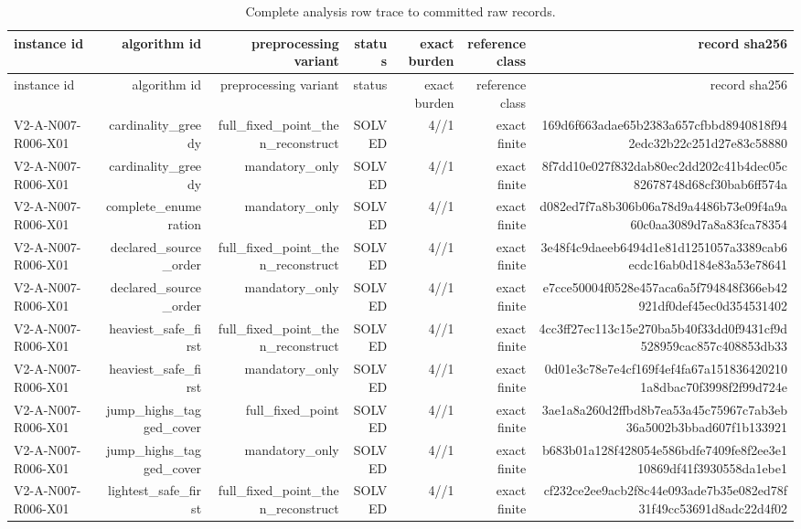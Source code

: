 {\footnotesize
\begin{longtable}{lrrrrrr}
\caption{Complete analysis row trace to committed raw records.}\label{tab:aor-analysis-trace}\\
\toprule
instance id & algorithm id & preprocessing variant & status & exact burden & reference class & record sha256 \\
\midrule
\endfirsthead
\toprule
instance id & algorithm id & preprocessing variant & status & exact burden & reference class & record sha256 \\
\midrule
\endhead
V2-A-N007-R006-X01 & cardinality\_greedy & full\_fixed\_point\_then\_reconstruct & SOLVED & 4//1 & exact finite & 169d6f663adae65b2383a657cfbbd8940818f942edc32b22c251d27e83c58880 \\
V2-A-N007-R006-X01 & cardinality\_greedy & mandatory\_only & SOLVED & 4//1 & exact finite & 8f7dd10e027f832dab80ec2dd202c41b4dec05c82678748d68cf30bab6ff574a \\
V2-A-N007-R006-X01 & complete\_enumeration & mandatory\_only & SOLVED & 4//1 & exact finite & d082ed7f7a8b306b06a78d9a4486b73e09f4a9a60c0aa3089d7a8a83fca78354 \\
V2-A-N007-R006-X01 & declared\_source\_order & full\_fixed\_point\_then\_reconstruct & SOLVED & 4//1 & exact finite & 3e48f4c9daeeb6494d1e81d1251057a3389cab6ecdc16ab0d184e83a53e78641 \\
V2-A-N007-R006-X01 & declared\_source\_order & mandatory\_only & SOLVED & 4//1 & exact finite & e7cce50004f0528e457aca6a5f794848f366eb42921df0def45ec0d354531402 \\
V2-A-N007-R006-X01 & heaviest\_safe\_first & full\_fixed\_point\_then\_reconstruct & SOLVED & 4//1 & exact finite & 4cc3ff27ec113c15e270ba5b40f33dd0f9431cf9d528959cac857c408853db33 \\
V2-A-N007-R006-X01 & heaviest\_safe\_first & mandatory\_only & SOLVED & 4//1 & exact finite & 0d01e3c78e7e4cf169f4ef4fa67a1518364202101a8dbac70f3998f2f99d724e \\
V2-A-N007-R006-X01 & jump\_highs\_tagged\_cover & full\_fixed\_point & SOLVED & 4//1 & exact finite & 3ae1a8a260d2ffbd8b7ea53a45c75967c7ab3eb36a5002b3bbad607f1b133921 \\
V2-A-N007-R006-X01 & jump\_highs\_tagged\_cover & mandatory\_only & SOLVED & 4//1 & exact finite & b683b01a128f428054e586bdfe7409fe8f2ee3e110869df41f3930558da1ebe1 \\
V2-A-N007-R006-X01 & lightest\_safe\_first & full\_fixed\_point\_then\_reconstruct & SOLVED & 4//1 & exact finite & cf232ce2ee9acb2f8c44e093ade7b35e082ed78f31f49cc53691d8adc22d4f02 \\

\end{longtable}}
